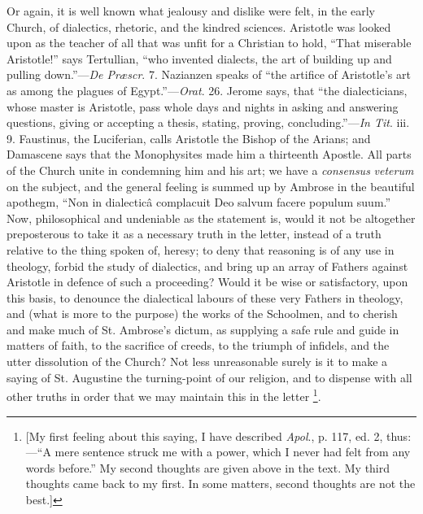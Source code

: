 Or again, it is well known what jealousy and
dislike were felt, in the early Church, of dialectics, rhetoric, and
the kindred sciences. Aristotle was looked upon as the teacher of all
that was unfit for a Christian to hold, ``That miserable
Aristotle!'' says Tertullian, ``who invented dialects, the art of
building up and pulling down.''—\emph{De Præscr}. 7. Nazianzen
speaks of ``the artifice of Aristotle's art as among the plagues of
Egypt.''—\emph{Orat}. 26. Jerome says, that ``the dialecticians,
whose master is Aristotle, pass whole days and nights in asking and
answering questions, giving or accepting a thesis, stating, proving,
concluding.''—\emph{In Tit}. iii. 9. Faustinus, the Luciferian,
calls Aristotle the Bishop of the Arians; and Damascene says that the
Monophysites made him a thirteenth Apostle. All parts of the Church
unite in condemning him and his art; we have a \emph{consensus} \emph{veterum}
on the subject, and the general feeling is summed up by Ambrose in the
beautiful apothegm, ``Non in dialecticâ complacuit Deo salvum facere
populum suum.'' Now, philosophical and undeniable as the statement
is, would it not be altogether preposterous to take it as a necessary
truth in the letter, instead of a truth relative to the thing spoken
of, heresy; to deny that reasoning is of any use in theology, forbid
the study of dialectics, and bring up an array of Fathers against
Aristotle in defence of such a proceeding? Would it be wise or
satisfactory, upon this basis, to denounce the dialectical labours of
these very Fathers in theology, and (what is more to the purpose) the
works of the Schoolmen, and to cherish and make much of St.
Ambrose's dictum, as supplying a safe rule and guide in matters of
faith, to the sacrifice of creeds, to the triumph of infidels, and the
utter dissolution of the Church? Not less unreasonable surely is it to
make a saying of St. Augustine the turning-point of our religion, and
to dispense with all other truths in order that we may maintain this
in the letter \footnote{[My first feeling about this saying, I have
described \emph{Apol}., p. 117, ed. 2, thus:—``A mere sentence
struck me with a power, which I never had felt from any words
before.'' My second thoughts are given above in the text. My third
thoughts came back to my first. In some matters, second thoughts are
not the best.]}.


